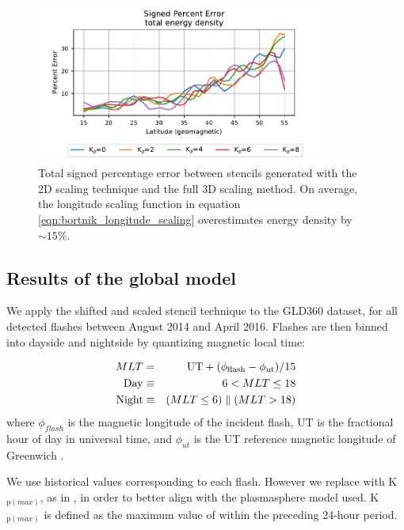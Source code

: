 \begin{figure}[h!]
\begin{center}
\includegraphics[width=0.85\textwidth]{figures/longitude_scaling_total_error.pdf}
\caption[Total percent error in 2D scaling]{Total signed percentage error between stencils generated with the 2D scaling technique and the full 3D scaling method. On average, the longitude scaling function in equation \eqref{eqn:bortnik_longitude_scaling} overestimates energy density by $\sim 15\%$.}
\label{fig:longitude_scaling_total}
\end{center}
\end{figure}

\subsection{Results of the global model}
We apply the shifted and scaled stencil technique to the GLD360 dataset, for all detected flashes between August 2014 and April 2016. Flashes are then binned into dayside and nightside by quantizing magnetic local time:

\begin{eqnarray}
\label{eqn:MLT}
MLT & = & \mathrm{UT} + (\phi_{\rm{flash}} - \phi_{\rm{ut}})/15 \\
\mathrm{Day} & \equiv & 6 < MLT \leq 18 \\
\mathrm{Night} & \equiv & (MLT \leq 6) \parallel (MLT > 18)
\end{eqnarray}
\noindent where $\phi_{flash}$ is the magnetic longitude of the incident flash, UT is the fractional hour of day in universal time, and $\phi_{ut}$ is the UT reference magnetic longitude of Greenwich \citep{Laundal2016}.

We use historical \kp{} values corresponding to each flash. However we replace \kp{} with K$_{\mathrm{p}(max)}$, as in \cite{Carpenter1992}, in order to better align with the plasmasphere model used. K$_{\mathrm{p}(max)}$ is defined as the maximum value of \kp{} within the preceding 24-hour period.

